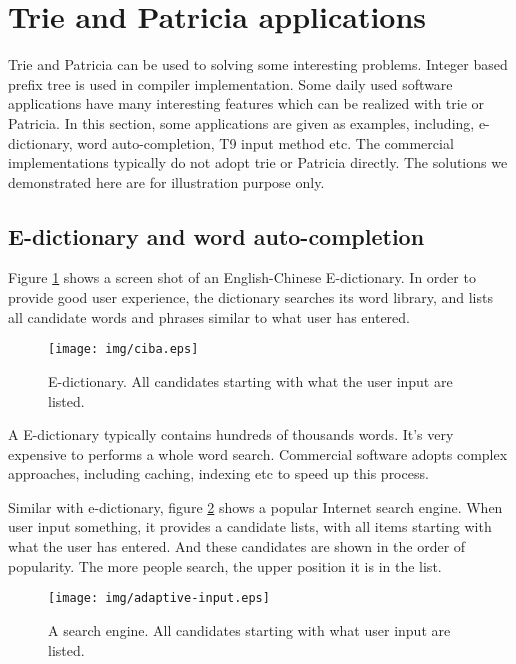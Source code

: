 \documentclass[UTF8]{article}
\begin{document}
\section{Trie and Patricia applications}

Trie and Patricia can be used to solving some interesting problems.
Integer based prefix tree is used in compiler implementation. Some daily
used software applications have many interesting features which can be
realized with trie or Patricia. In this section, some applications are
given as examples, including, e-dictionary, word auto-completion, T9
input method etc.
The commercial implementations typically do not adopt trie or Patricia
directly. The solutions we demonstrated here are for illustration purpose
only.

\subsection{E-dictionary and word auto-completion}
Figure \ref{fig:e-dict} shows a screen shot of an English-Chinese E-dictionary.
In order to provide good user experience,
the dictionary searches its word library, and lists all candidate words and
phrases similar to what user has entered.

\begin{figure}[htbp]
  \centering
  \texttt{[image: img/ciba.eps]}
  \caption{E-dictionary. All candidates starting with what the user input are listed.}
  \label{fig:e-dict}
\end{figure}

A E-dictionary typically contains hundreds of thousands words. It's very expensive
to performs a whole word search. Commercial software adopts complex approaches, including
caching, indexing etc to speed up this process.

Similar with e-dictionary, figure \ref{fig:word-completion} shows a popular
Internet search engine. When user input something, it provides a candidate
lists, with all items starting with what the user has entered. And these candidates
are shown in the order of popularity. The more people search, the
upper position it is in the list.

\begin{figure}[htbp]
  \centering
  \texttt{[image: img/adaptive-input.eps]}
  \caption{A search engine. All candidates starting with what user input are listed.}
  \label{fig:word-completion}
\end{figure}
\end{document}
